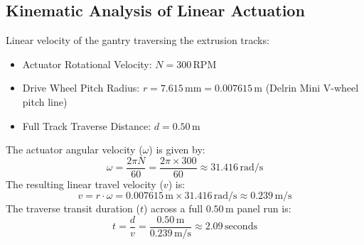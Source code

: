 \documentclass[10pt,a4paper]{article}
\begin{document}
\subsection{Kinematic Analysis of Linear Actuation}
Linear velocity of the gantry traversing the extrusion tracks:
\begin{itemize}[leftmargin=*]
    \item Actuator Rotational Velocity: $N = 300\,\text{RPM}$
    \item Drive Wheel Pitch Radius: $r = 7.615\,\text{mm} = 0.007615\,\text{m}$ (Delrin Mini V-wheel pitch line)
    \item Full Track Traverse Distance: $d = 0.50\,\text{m}$
\end{itemize}
The actuator angular velocity ($\omega$) is given by:
\begin{equation}
    \omega = \frac{2\pi N}{60} = \frac{2\pi \times 300}{60} \approx 31.416\,\text{rad/s}
\end{equation}
The resulting linear travel velocity ($v$) is:
\begin{equation}
    v = r \cdot \omega = 0.007615\,\text{m} \times 31.416\,\text{rad/s} \approx 0.239\,\text{m/s}
\end{equation}
The traverse transit duration ($t$) across a full $0.50\,\text{m}$ panel run is:
\begin{equation}
    t = \frac{d}{v} = \frac{0.50\,\text{m}}{0.239\,\text{m/s}} \approx 2.09\,\text{seconds}
\end{equation}
\end{document}
